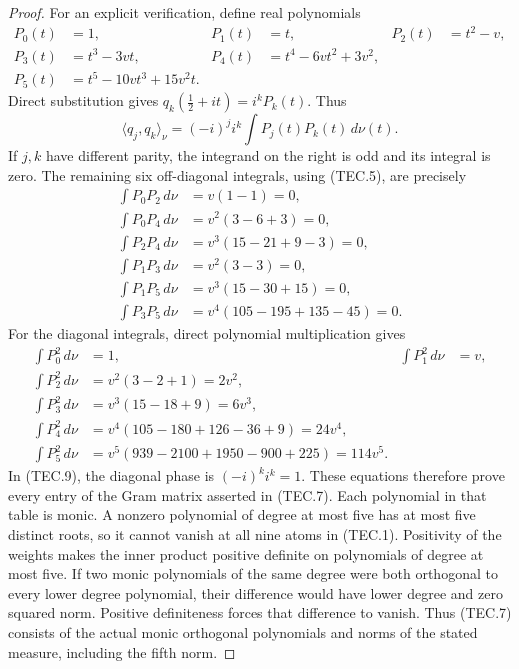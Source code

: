\begin{proof}
For an explicit verification, define real polynomials
\[
\begin{aligned}
 P_0(t)&=1,&P_1(t)&=t,&P_2(t)&=t^2-v,\\
 P_3(t)&=t^3-3vt,&P_4(t)&=t^4-6vt^2+3v^2,\\
 P_5(t)&=t^5-10vt^3+15v^2t.
\end{aligned}                                                     \tag{TEC.8}
\]
Direct substitution gives
\(q_k(\tfrac12+it)=i^kP_k(t)\).  Thus
\[
 \langle q_j,q_k\rangle_\nu
            =(-i)^ji^k\int P_j(t)P_k(t)\,d\nu(t).                 \tag{TEC.9}
\]
If \(j,k\) have different parity, the integrand on the right is odd
and its integral is zero.  The remaining six off-diagonal integrals,
using (TEC.5), are precisely
\[
\begin{aligned}
 \int P_0P_2\,d\nu
    &=v(1-1)=0,\\
 \int P_0P_4\,d\nu
    &=v^2(3-6+3)=0,\\
 \int P_2P_4\,d\nu
    &=v^3(15-21+9-3)=0,\\
 \int P_1P_3\,d\nu
    &=v^2(3-3)=0,\\
 \int P_1P_5\,d\nu
    &=v^3(15-30+15)=0,\\
 \int P_3P_5\,d\nu
    &=v^4(105-195+135-45)=0.
\end{aligned}                                                     \tag{TEC.10}
\]
For the diagonal integrals, direct polynomial multiplication gives
\[
\begin{aligned}
 \int P_0^2\,d\nu&=1,&\int P_1^2\,d\nu&=v,\\
 \int P_2^2\,d\nu&=v^2(3-2+1)=2v^2,\\
 \int P_3^2\,d\nu&=v^3(15-18+9)=6v^3,\\
 \int P_4^2\,d\nu&=v^4(105-180+126-36+9)=24v^4,\\
 \int P_5^2\,d\nu&=v^5(939-2100+1950-900+225)=114v^5.
\end{aligned}                                                     \tag{TEC.11}
\]
In (TEC.9), the diagonal phase is \((-i)^ki^k=1\).  These equations
therefore prove every entry of the Gram matrix asserted in (TEC.7).
Each polynomial in that table is monic.  A nonzero polynomial of degree
at most five has at most five distinct roots, so it cannot vanish at all
nine atoms in (TEC.1).  Positivity of the weights makes the inner product
positive definite on polynomials of degree at most five.  If two monic
polynomials of the same degree were both orthogonal to every lower
degree polynomial, their difference would have lower degree and zero
squared norm.  Positive definiteness forces that difference to vanish.
Thus (TEC.7) consists of the actual monic orthogonal polynomials and
norms of the stated measure, including the fifth norm.
\end{proof}

